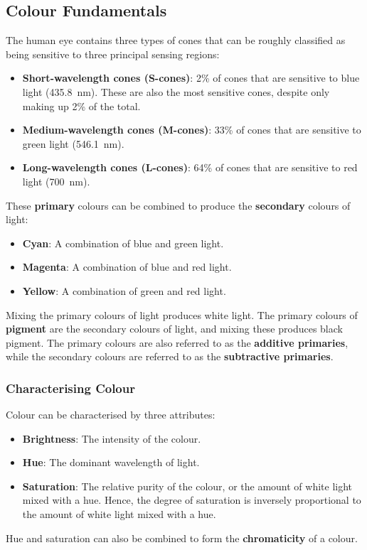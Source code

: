 \documentclass{article}
\begin{document}
\subsection{Colour Fundamentals}
The human eye contains three types of cones that can be roughly
classified as being sensitive to three principal sensing regions:
\begin{itemize}
    \item \textbf{Short-wavelength cones (S-cones)}: 2\% of cones that are sensitive to blue light (\qty{435.8}{nm}). These are also the most sensitive cones, despite only making up 2\% of the total.
    \item \textbf{Medium-wavelength cones (M-cones)}: 33\% of cones that are sensitive to green light (\qty{546.1}{nm}).
    \item \textbf{Long-wavelength cones (L-cones)}: 64\% of cones that are sensitive to red light (\qty{700}{nm}).
\end{itemize}
These \textbf{primary} colours can be combined to produce the
\textbf{secondary} colours of light:
\begin{itemize}
    \item \textbf{Cyan}: A combination of blue and green light.
    \item \textbf{Magenta}: A combination of blue and red light.
    \item \textbf{Yellow}: A combination of green and red light.
\end{itemize}
Mixing the primary colours of light produces white light. The primary
colours of \textbf{pigment} are the secondary colours of light, and
mixing these produces black pigment. The primary colours are also
referred to as the \textbf{additive primaries}, while the secondary
colours are referred to as the \textbf{subtractive primaries}.
\subsubsection{Characterising Colour}
Colour can be characterised by three attributes:
\begin{itemize}
    \item \textbf{Brightness}: The intensity of the colour.
    \item \textbf{Hue}: The dominant wavelength of light.
    \item \textbf{Saturation}: The relative purity of the colour, or the amount of white light mixed with a hue.
    Hence, the degree of saturation is inversely proportional to the amount of white light mixed with a hue.
\end{itemize}
Hue and saturation can also be combined to form the \textbf{chromaticity}
of a colour.
\end{document}
